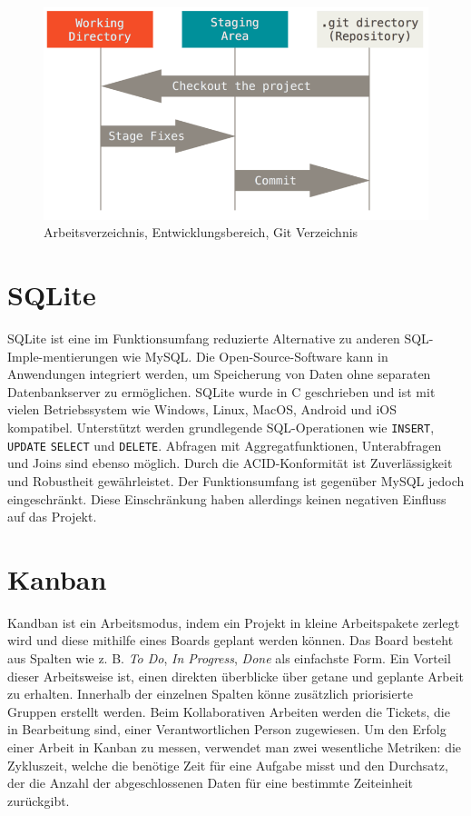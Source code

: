 \begin{figure}[ht]
	\centering
	\includegraphics[width=.9\linewidth]{git-sections.png}
	\caption{Arbeitsverzeichnis, Entwicklungsbereich, Git Verzeichnis}
	\label{git-sections}
\end{figure}

\section{SQLite}
SQLite ist eine im Funktionsumfang reduzierte Alternative zu anderen SQL-Imple-mentierungen wie MySQL.
Die Open-Source-Software kann in Anwendungen integriert werden, um Speicherung von Daten ohne separaten Datenbankserver zu ermöglichen. 
SQLite wurde in C geschrieben und ist mit vielen Betriebssystem wie Windows, Linux, MacOS, Android und iOS kompatibel. 
Unterstützt werden grundlegende SQL-Operationen wie \texttt{INSERT}, \texttt{UPDATE} \texttt{SELECT} und \texttt{DELETE}. 
Abfragen mit Aggregatfunktionen, Unterabfragen und Joins sind ebenso möglich. 
Durch die ACID-Konformität ist Zuverlässigkeit und Robustheit gewährleistet. 
Der Funktionsumfang ist gegenüber MySQL jedoch eingeschränkt. 
Diese Einschränkung haben allerdings keinen negativen Einfluss auf das Projekt.

\section{Kanban}
Kandban ist ein Arbeitsmodus, indem ein Projekt in kleine Arbeitspakete zerlegt wird und diese mithilfe eines Boards geplant werden können.
Das Board besteht aus Spalten wie z. B. \emph{To Do}, \emph{In Progress}, \emph{Done} als einfachste Form.
Ein Vorteil dieser Arbeitsweise ist, einen direkten überblicke über getane und geplante Arbeit zu erhalten.
Innerhalb der einzelnen Spalten könne zusätzlich priorisierte Gruppen erstellt werden.
Beim Kollaborativen Arbeiten werden die Tickets, die in Bearbeitung sind, einer Verantwortlichen Person zugewiesen.
Um den Erfolg einer Arbeit in Kanban zu messen, verwendet man zwei wesentliche Metriken: die Zykluszeit, welche die benötige Zeit für eine Aufgabe misst und den Durchsatz, der die Anzahl der abgeschlossenen Daten für eine bestimmte Zeiteinheit zurückgibt. \cite{kanban}

